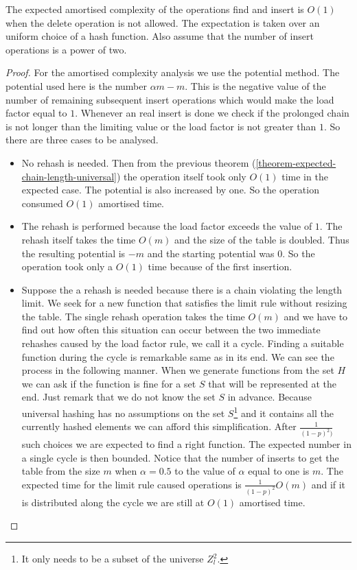 \begin{theorem}
The expected amortised complexity of the operations find and insert is $O(1)$ when the delete operation is not allowed. The expectation is taken over an uniform choice of a hash function. Also assume that the number of insert operations is a power of two.
\end{theorem}
\begin{proof}
For the amortised complexity analysis we use the potential method. The potential used here is the number $\alpha m - m$. This is the negative value of the number of remaining subsequent insert operations which would make the load factor equal to $1$. Whenever an real insert is done we check if the prolonged chain is not longer than the limiting value or the load factor is not greater than $1$. So there are three cases to be analysed.
\begin{itemize}
\item No rehash is needed. Then from the previous theorem (\ref{theorem-expected-chain-length-universal}) the operation itself took only $O(1)$ time in the expected case. The potential is also increased by one. So the operation consumed $O(1)$ amortised time.
\item The rehash is performed because the load factor exceeds the value of $1$. The rehash itself takes the time $O(m)$ and the size of the table is doubled. Thus the resulting potential is $-m$ and the starting potential was $0$. So the operation took only a $O(1)$ time because of the first insertion.
\item Suppose the a rehash is needed because there is a chain violating the length limit. We seek for a new function that satisfies the limit rule without resizing the table. The single rehash operation takes the time $O(m)$ and we have to find out how often this situation can occur between the two immediate rehashes caused by the load factor rule, we call it a cycle. Finding a suitable function during the cycle is remarkable same as in its end. We can see the process in the following manner. When we generate functions from the set $H$ we can ask if the function is fine for a set $S$ that will be represented at the end. Just remark that we do not know the set $S$ in advance. Because universal hashing has no assumptions on the set $S$\footnote{It only needs to be a subset of the universe $Z^2_l$.} and it contains all the currently hashed elements we can afford this simplification. After $\frac{1}{(1-p)^2)}$ such choices we are expected to find a right function. The expected number in a single cycle is then bounded. Notice that the number of inserts to get the table from the size $m$ when $\alpha = 0.5$ to the value of $\alpha$ equal to one is $m$. The expected time for the limit rule caused operations is $\frac{1}{(1 - p)^2}O(m)$ and if it is distributed along the cycle we are still at $O(1)$ amortised time.
\end{itemize}


\end{proof}
